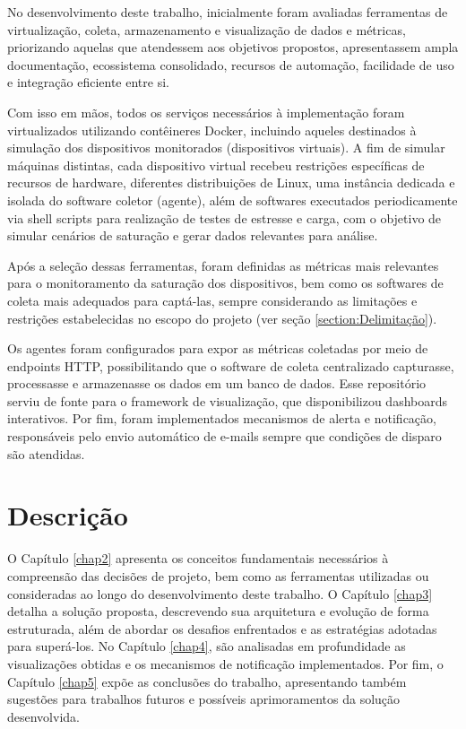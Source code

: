 No desenvolvimento deste trabalho, inicialmente foram avaliadas ferramentas de virtualização, coleta, armazenamento e visualização de dados e métricas, priorizando aquelas que atendessem aos objetivos propostos, apresentassem ampla documentação, ecossistema consolidado, recursos de automação, facilidade de uso e integração eficiente entre si.

Com isso em mãos, todos os serviços necessários à implementação foram virtualizados utilizando contêineres Docker, incluindo aqueles destinados à simulação dos dispositivos monitorados (dispositivos virtuais). A fim de simular máquinas distintas, cada dispositivo virtual recebeu restrições específicas de recursos de hardware, diferentes distribuições de Linux, uma instância dedicada e isolada do software coletor (agente), além de softwares executados periodicamente via shell scripts para realização de testes de estresse e carga, com o objetivo de simular cenários de saturação e gerar dados relevantes para análise.

Após a seleção dessas ferramentas, foram definidas as métricas mais relevantes para o monitoramento da saturação dos dispositivos, bem como os softwares de coleta mais adequados para captá-las, sempre considerando as limitações e restrições estabelecidas no escopo do projeto (ver seção \ref{section:Delimitação}).

Os agentes foram configurados para expor as métricas coletadas por meio de endpoints HTTP, possibilitando que o software de coleta centralizado capturasse, processasse e armazenasse os dados em um banco de dados. Esse repositório serviu de fonte para o framework de visualização, que disponibilizou dashboards interativos. Por fim, foram implementados mecanismos de alerta e notificação, responsáveis pelo envio automático de e-mails sempre que condições de disparo são atendidas.

\newpage

\section{Descrição}
\label{section:Descricao}

O Capítulo \ref{chap2} apresenta os conceitos fundamentais necessários à compreensão das decisões de projeto, bem como as ferramentas utilizadas ou consideradas ao longo do desenvolvimento deste trabalho. O Capítulo \ref{chap3} detalha a solução proposta, descrevendo sua arquitetura e evolução de forma estruturada, além de abordar os desafios enfrentados e as estratégias adotadas para superá-los. No Capítulo \ref{chap4}, são analisadas em profundidade as visualizações obtidas e os mecanismos de notificação implementados. Por fim, o Capítulo \ref{chap5} expõe as conclusões do trabalho, apresentando também sugestões para trabalhos futuros e possíveis aprimoramentos da solução desenvolvida.
